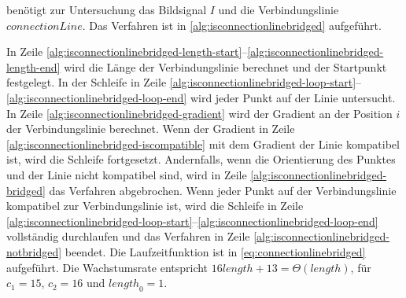  benötigt zur Untersuchung das Bildsignal $I$ und die Verbindungslinie $\mathit{connectionLine}$. Das Verfahren ist in \autoref{alg:isconnectionlinebridged} aufgeführt.

In Zeile \ref{alg:isconnectionlinebridged-length-start}--\ref{alg:isconnectionlinebridged-length-end} wird die Länge
 der Verbindungslinie berechnet und der Startpunkt festgelegt. In der Schleife in Zeile
 \ref{alg:isconnectionlinebridged-loop-start}--\ref{alg:isconnectionlinebridged-loop-end} wird jeder Punkt auf der
 Linie untersucht. In Zeile \ref{alg:isconnectionlinebridged-gradient} wird der Gradient an der Position $i$  der
 Verbindungslinie berechnet. Wenn der Gradient in Zeile \ref{alg:isconnectionlinebridged-iscompatible} mit dem Gradient
 der Linie kompatibel ist, wird die Schleife fortgesetzt. Andernfalls, wenn die Orientierung des Punktes und der Linie
 nicht kompatibel sind, wird in Zeile \ref{alg:isconnectionlinebridged-bridged} das Verfahren abgebrochen. Wenn jeder
 Punkt auf der Verbindungslinie kompatibel zur Verbindungslinie ist, wird die Schleife in Zeile
 \ref{alg:isconnectionlinebridged-loop-start}--\ref{alg:isconnectionlinebridged-loop-end} vollständig durchlaufen und
 das Verfahren in Zeile \ref{alg:isconnectionlinebridged-notbridged} beendet. Die Laufzeitfunktion ist in
 \autoref{eq:connectionlinebridged} aufgeführt. Die Wachstumsrate entspricht
 $16\mathit{length} + 13 = \Theta(\mathit{length})$, für $c_{1} = 15$, $c_{2} = 16$ und $\mathit{length}_{0} = 1$.


